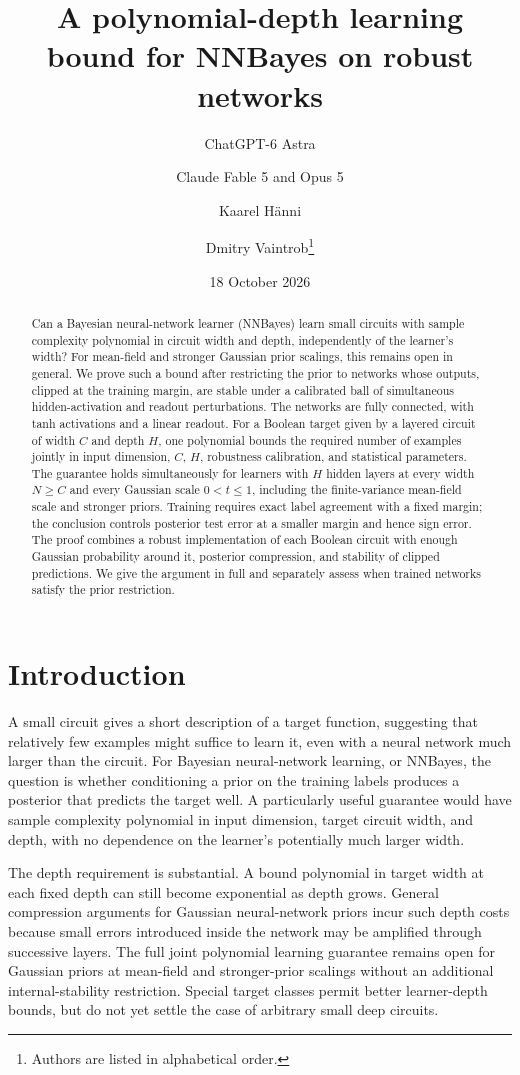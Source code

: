 \documentclass[11pt]{article}
\title{A polynomial-depth learning bound for NNBayes on robust networks}
\author{ChatGPT-6 Astra \and Claude Fable 5 and Opus 5 \and Kaarel H\"anni \and Dmitry Vaintrob\thanks{Authors are listed in alphabetical order.}}
\date{18 October 2026}
\begin{document}
\maketitle
\begin{abstract}
Can a Bayesian neural-network learner (NNBayes) learn small circuits with
sample complexity
polynomial in circuit width and depth, independently of the
learner's width? For mean-field and stronger Gaussian prior scalings, this
remains open in general. We prove such a bound after restricting the prior
to networks whose outputs, clipped at the training margin, are stable
under a calibrated ball of simultaneous hidden-activation and readout
perturbations. The networks are fully connected, with tanh activations and
a linear readout. For a Boolean target given by a layered circuit of width
$C$ and depth $H$, one polynomial bounds the required number of examples
jointly in input dimension, $C$, $H$, robustness calibration, and statistical
parameters. The guarantee holds simultaneously for learners with $H$ hidden
layers at every width $N\ge C$ and every Gaussian scale $0<t\le1$, including the
finite-variance mean-field scale and stronger priors. Training requires
exact label agreement with a fixed margin; the conclusion controls
posterior test error at a smaller margin and hence sign error. The proof
combines a robust implementation of each Boolean circuit with enough
Gaussian probability around it, posterior compression, and stability of
clipped predictions. We give the argument in full and separately assess
when trained networks satisfy the prior restriction.
\end{abstract}

\section{Introduction}

A small circuit gives a short description of a target function, suggesting
that relatively few examples might suffice to learn it, even with a neural
network much larger than the circuit. For Bayesian neural-network learning,
or NNBayes, the question is whether conditioning
a prior on the training labels produces a posterior that predicts the
target well. A particularly useful guarantee would have sample complexity
polynomial in input dimension, target circuit width, and depth,
with no dependence on the learner's potentially much larger width.

The depth requirement is substantial. A bound polynomial in target width
at each fixed depth can still become exponential as depth grows. General
compression arguments for Gaussian neural-network priors incur such depth
costs because small errors introduced inside the network may be amplified
through successive layers. The full joint polynomial learning guarantee
remains open for Gaussian priors at mean-field and stronger-prior scalings
without an additional internal-stability restriction. Special target
classes permit better learner-depth bounds, but do not yet settle the case
of arbitrary small deep circuits.
\end{document}
